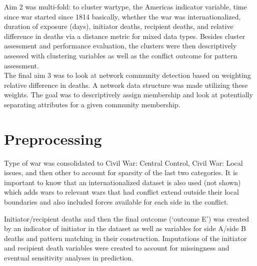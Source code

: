 \documentclass[
]{article}
\begin{document}
Aim 2 was multi-fold: to cluster wartype, the Americas indicator
variable, time since war started since 1814 basically, whether the war
was internationalized, duration of exposure (days), initiator deaths,
recipient deaths, and relative difference in deaths via a distance
metric for mixed data types. Besides cluster assessment and performance
evaluation, the clusters were then descriptively assessed with
clustering variables as well as the conflict outcome for pattern
assessment.\\

The final aim 3 was to look at network community detection based on
weighting relative difference in deaths. A network data structure was
made utilizing these weights. The goal was to descriptively assign
membership and look at potentially separating attributes for a given
community membership.

\hypertarget{preprocessing}{%
\section{Preprocessing}\label{preprocessing}}

Type of war was consolidated to Civil War: Central Control, Civil War:
Local issues, and then other to account for sparsity of the last two
categories. It is important to know that an internationalized dataset is
also used (not shown) which adds wars to relevant wars that had conflict
extend outside their local boundaries and also included forces available
for each side in the conflict.

Initiator/recipient deaths and then the final outcome (`outcome E') was
created by an indicator of initiator in the dataset as well as variables
for side A/side B deaths and pattern matching in their construction.
Imputations of the initiator and recipient death variables were created
to account for missingness and eventual sensitivity analyses in
prediction.
\end{document}
